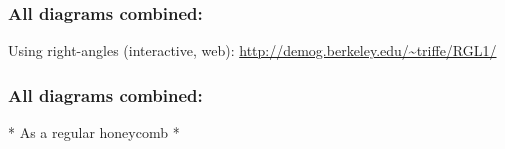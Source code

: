 \documentclass[20pt]{beamer}
\begin{document}
\begin{frame}
\frametitle{All diagrams combined:}
Using right-angles (interactive, web):
\url{http://demog.berkeley.edu/~triffe/RGL1/}

\end{frame}

\begin{frame}
\frametitle{All diagrams combined:}

* As a regular honeycomb *

\end{frame}

%
%
%
%
\end{document}
